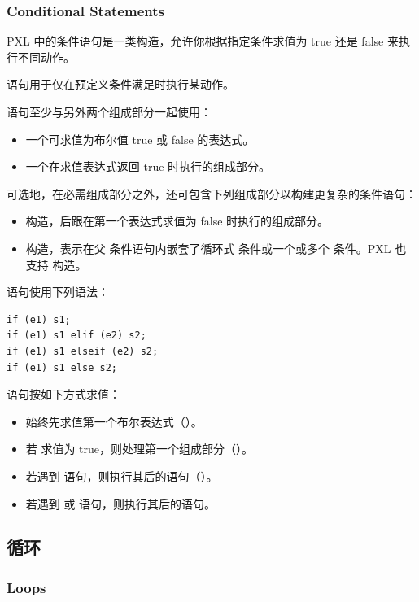 \subsubsection*{Conditional Statements}

PXL 中的条件语句是一类构造，允许你根据指定条件求值为 true 还是 false 来执行不同动作。

 语句用于仅在预定义条件满足时执行某动作。

 语句至少与另外两个组成部分一起使用：
\begin{itemize}
  \item 一个可求值为布尔值 true 或 false 的表达式。
  \item 一个在求值表达式返回 true 时执行的组成部分。
\end{itemize}

可选地，在必需组成部分之外，还可包含下列组成部分以构建更复杂的条件语句：
\begin{itemize}
  \item {} 构造，后跟在第一个表达式求值为 false 时执行的组成部分。
  \item {} 构造，表示在父  条件语句内嵌套了循环式  条件或一个或多个  条件。PXL 也支持  构造。
\end{itemize}

 语句使用下列语法：
\begin{lstlisting}[style=pxl]
if (e1) s1;
if (e1) s1 elif (e2) s2;
if (e1) s1 elseif (e2) s2;
if (e1) s1 else s2;
\end{lstlisting}

 语句按如下方式求值：
\begin{itemize}
  \item 始终先求值第一个布尔表达式（）。
  \item 若  求值为 true，则处理第一个组成部分（）。
  \item 若遇到  语句，则执行其后的语句（）。
  \item 若遇到  或  语句，则执行其后的语句。
\end{itemize}

\subsection{循环}
\subsubsection*{Loops}

